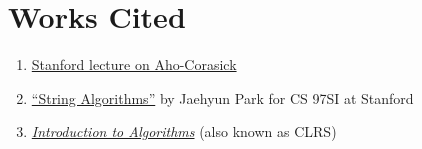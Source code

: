 \documentclass[11pt, oneside]{article}
\begin{document}
\section{Works Cited}

\begin{enumerate}
  \item \href{http://web.stanford.edu/class/archive/cs/cs166/cs166.1166/lectures/02/Small02.pdf}{Stanford lecture on Aho-Corasick}
  \item \href{https://web.stanford.edu/class/cs97si/10-string-algorithms.pdf}{``String Algorithms''} by Jaehyun Park for CS 97SI at Stanford
  \item \href{https://mitpress.mit.edu/books/introduction-algorithms-third-edition}{\textit{Introduction to Algorithms}} (also known as CLRS)
\end{enumerate}
\end{document}
